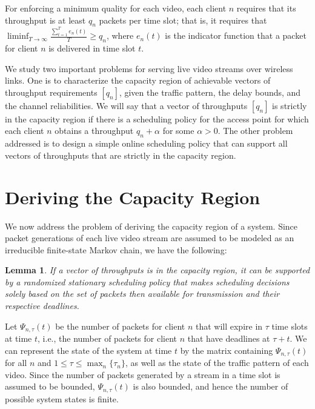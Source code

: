 \documentclass[10pt,nocopyrightspace]{sigplan-proc-varsize-1in}
\newtheorem{lemma}{Lemma}
\begin{document}
For enforcing a minimum quality for each video, each client $n$ requires that its throughput is at least $q_n$ packets per time slot; that is, it requires that $\liminf_{T\rightarrow\infty}\frac{\sum_{t=1}^Te_n(t)}{T}\geq q_n$, where $e_n(t)$ is the indicator function that a packet for client $n$ is delivered in time slot $t$.

We study two important problems for serving live video streams over wireless links. One is to characterize the capacity region of achievable vectors of throughput requirements $[q_n]$, given the traffic pattern, the delay bounds, and the channel reliabilities. We will say that a vector of throughputs $[q_n]$ is strictly in the capacity region if there is a scheduling policy for the access point for which each client $n$ obtains a throughput $q_n+\alpha$ for some $\alpha >0$. The other problem addressed is to design a simple online scheduling policy that can support all vectors of throughputs that are strictly in the capacity region.

\section{Deriving the Capacity Region}	\label{section:feasibility}

We now address the problem of deriving the capacity region of a system. Since packet generations of each live video stream are assumed to be modeled as an irreducible finite-state Markov chain, we have the following:

\begin{lemma}	\label{lemma:feasibility:Markov}
If a vector of throughputs is in the capacity region, it can be supported by a randomized stationary scheduling policy that makes scheduling decisions solely based on the set of packets then available for transmission and their respective deadlines.
\end{lemma}

Let $\Psi_{n,\tau}(t)$ be the number of packets for client $n$ that will expire in $\tau$ time slots at time $t$, i.e., the number of packets for client $n$ that have deadlines at $\tau+t$. We can represent the state of the system at time $t$ by the matrix containing $\Psi_{n,\tau}(t)$ for all $n$ and $1\leq \tau\leq \max_n\{\tau_n\}$, as well as the state of the traffic pattern of each video. Since the number of packets generated by a stream in a time slot is assumed to be bounded, $\Psi_{n,\tau}(t)$ is also bounded, and hence the number of possible system states is finite.
\end{document}
